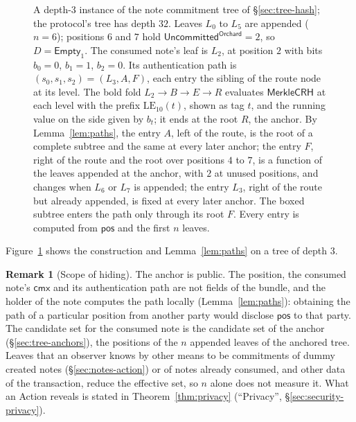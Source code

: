 \documentclass[11pt,a4paper]{article}
\theoremstyle{definition}
\newtheorem{remark}[theorem]{Remark}
\newcommand{\cmx}{\mathsf{cmx}}
\begin{document}
\begin{figure}[tp]
\caption{A depth-$3$ instance of the note commitment tree of
\S\ref{sec:tree-hash}; the protocol's tree has depth $32$. Leaves $L_0$ to
$L_5$ are appended ($n = 6$); positions $6$ and $7$ hold
$\mathsf{Uncommitted}^{\mathsf{Orchard}} = 2$, so $D = \mathsf{Empty}_1$.
The consumed note's leaf is $L_2$, at position $2$ with bits $b_0 = 0$,
$b_1 = 1$, $b_2 = 0$. Its authentication path is $(s_0, s_1, s_2) =
(L_3, A, F)$, each entry the sibling of the route node at its level. The
bold fold $L_2 \to B \to E \to R$ evaluates $\mathsf{MerkleCRH}$ at each
level with the prefix $\mathrm{LE}_{10}(t)$, shown as tag $t$, and the
running value on the side given by $b_t$; it ends at the root $R$, the
anchor. By Lemma~\ref{lem:paths}, the entry $A$, left of the route, is the
root of a complete subtree and the same at every later anchor; the entry
$F$, right of the route and the root over positions $4$ to $7$, is a
function of the leaves appended at the anchor, with $2$ at unused positions,
and changes when $L_6$ or $L_7$ is appended; the entry $L_3$, right of the
route but already appended, is fixed at every later anchor. The boxed
subtree enters the path only through its root $F$. Every entry is computed
from $\mathsf{pos}$ and the first $n$ leaves.}
\label{fig:merklepath}
\end{figure}

Figure~\ref{fig:merklepath} shows the construction and
Lemma~\ref{lem:paths} on a tree of depth $3$.

\begin{remark}[Scope of hiding]
The anchor is public. The position, the consumed note's $\cmx$ and its
authentication path are not fields of the bundle, and the holder of the note
computes the path locally (Lemma~\ref{lem:paths}): obtaining the path of a
particular position from another party would disclose $\mathsf{pos}$ to that
party. The candidate set for the consumed note is the candidate set of the
anchor (\S\ref{sec:tree-anchors}), the positions of the $n$ appended leaves
of the anchored tree. Leaves that an observer knows by other means to be
commitments of dummy created notes (\S\ref{sec:notes-action}) or of notes
already consumed, and other data of the transaction, reduce the effective
set, so $n$ alone does not measure it. What an Action reveals is stated in
Theorem~\ref{thm:privacy} (``Privacy'', \S\ref{sec:security-privacy}).
\end{remark}
\end{document}
